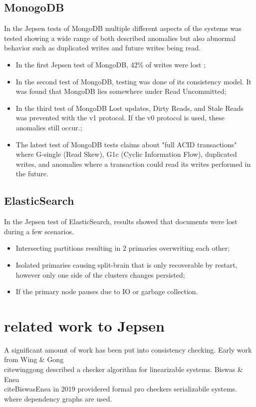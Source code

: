 \documentclass[a4paper,10pt,titlepage]{report}
\begin{document}
\subsection{MonogoDB}
In the Jepsen tests of MongoDB\cite{jepsenmongodb243, jepsenmongodb267, jepsenmongodb340} multiple different aspects of the systems was tested showing a wide range of both described anomalies but also abnormal behavior such as duplicated writes and future writes being read.
\begin{itemize}
\item In the first Jepsen test of MongoDB, 42\% of writes were lost \cite{jepsenmongodb243};
\item In the second test of MongoDB, testing was done of its consistency model. It was found that MongoDB lies somewhere under Read Uncommitted\cite{jepsenmongodb267};
\item In the third test of MongoDB Lost updates, Dirty Reads, and Stale Reads was prevented with the v1 protocol. If the v0 protocol is used, these anomalies still occur.\cite{jepsenmongodb340};
\item The latest test of MongoDB tests claims about "full ACID transactions" where G-single (Read Skew), G1c (Cyclic Information Flow), duplicated writes, and anomalies where a transaction could read its writes performed in the future. \cite{jepsenmongodb340}
\end{itemize}

\subsection{ElasticSearch}
In the Jepsen test of ElasticSearch, results showed that documents were lost during a few scenarios.\cite{aphyrelasticsearch}
\begin{itemize}
    \item Intersecting partitions resulting in 2 primaries overwriting each other;
    \item Isolated primaries causing split-brain that is only recoverable by restart, however only one side of the clusters changes persisted;
    \item If the primary node pauses due to IO or garbage collection.
\end{itemize}


\section{related work to Jepsen}

A significant amount of work has been put into consistency checking. Early work from Wing \& Gong\\cite{winggong} described a checker algorithm for linearizable systems. 
Biswas \& Enea\\cite{BiswasEnea} in 2019 providered formal pro checkers serializabile systems. where dependency graphs are used.
\end{document}
